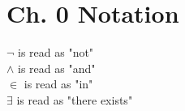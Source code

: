 \documentclass[11pt]{article}
\begin{document}
\section*{Ch. 0 Notation}

$\lnot$ is read as "not"\\
$\land$ is read as "and"\\
$\in$ is read as "in"\\
$\exists$ is read as "there exists"
\end{document}
